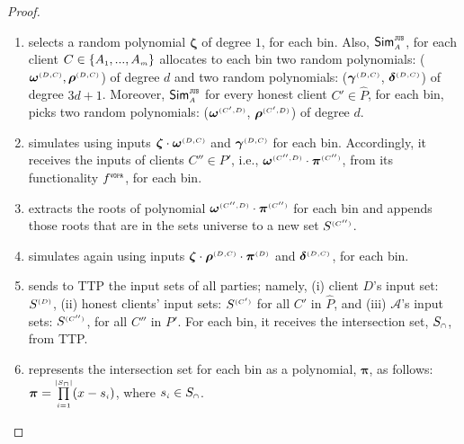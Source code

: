\begin{proof}
\begin{enumerate}
%
\item selects a random polynomial ${\bm\zeta}$ of degree $1$, for each bin. Also, $\mathsf{Sim}^{\scriptscriptstyle \mathtt{JUS}}_{\scriptscriptstyle A}$, for each client $  {  C}\in \{  {  A}_{ \scriptscriptstyle {   1}}, ...,   {  A}_{ \scriptscriptstyle {   m}}\}$ allocates to each bin two random polynomials: (${\bm\omega}^{ \scriptscriptstyle {  {(D,C)}}}, {\bm\rho}^{ \scriptscriptstyle {  {(D,C)}}}$) of degree $d$ and   two random polynomials: (${\bm\gamma}^{ \scriptscriptstyle {  {(D,C)}}}$, ${\bm\delta}^{ \scriptscriptstyle {  {(D,C)}}}$) of degree $3d+1$. Moreover, $\mathsf{Sim}^{\scriptscriptstyle \mathtt{JUS}}_{\scriptscriptstyle A}$ for every honest client $C'\in \hat P$, for each bin, picks two random polynomials: (${\bm\omega}^{ \scriptscriptstyle {  {(C',D)}}}$, ${\bm\rho}^{ \scriptscriptstyle {  {(C',D)}}}$) of degree $d$. %
%
\item\label{F-PSI::sim-A-first-VOPR-invocation} simulates \vopr using inputs ${\bm\zeta} \cdot {\bm\omega}^{ \scriptscriptstyle {  {(D,C)}}}$ and ${\bm\gamma}^{ \scriptscriptstyle {  {(D,C)}}}$ for each bin. Accordingly, it receives the inputs of clients $C''\in P'$, i.e., ${\bm\omega}^{ \scriptscriptstyle {  {(C'',D)}}}\cdot {\bm\pi}^{ \scriptscriptstyle {  {(C'')}}}$, from its functionality $f^{\scriptscriptstyle \mathtt{VOPR}}$, for each bin.  
%
%
\item extracts the roots of polynomial ${\bm\omega}^{ \scriptscriptstyle {  {(C'',D)}}}\cdot {\bm\pi}^{ \scriptscriptstyle {  {(C'')}}}$ for each bin and appends those roots that are in the sets universe to a new set $S^{\scriptscriptstyle(C'')}$. 
%
\item simulates  \vopr again using inputs ${\bm\zeta}\cdot {\bm \rho}^{ \scriptscriptstyle {  {(D,C)}}}\cdot {\bm\pi}^{ \scriptscriptstyle {  {(D)}}}$ and ${\bm\delta}^{ \scriptscriptstyle {  {(D,C)}}}$, for each bin. %
%
\item sends to TTP the input sets of all parties; namely, (i) client $D$'s input set: $S^{\scriptscriptstyle (D)}$, (ii) honest clients' input sets: $S^{\scriptscriptstyle (C')}$ for all $C'$ in $\hat P$, and (iii) $\mathcal{A}$'s input sets: $S^{\scriptscriptstyle(C'')}$, for all $C''$ in $P'$.  For each bin, it receives the intersection set, $S_{\scriptscriptstyle\cap}$, from TTP. 
%
\item represents the intersection set for each bin as a polynomial, ${\bm \pi}$, as follows: ${\bm \pi}=\prod\limits^{\scriptscriptstyle |S_{\scriptscriptstyle\cap}|}_{\scriptscriptstyle i=1 }(x-s_{\scriptscriptstyle i})$, where $s_{\scriptscriptstyle i}\in S_{\scriptscriptstyle\cap}$. 


\end{enumerate}
\end{proof}
